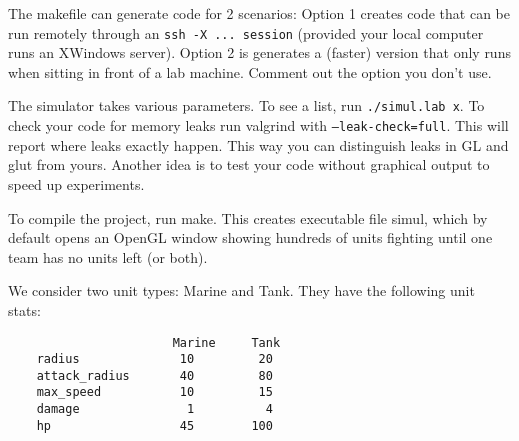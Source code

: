 \documentclass[a4paper,11pt]{article}
\begin{document}
\bigskip

The makefile can generate code for 2 scenarios: Option 1 creates code that can
be run remotely through an \texttt{ssh -X ... session} (provided your local computer
runs an XWindows server). Option 2 is generates a (faster) version that only
runs when sitting in front of a lab machine. Comment out the option you
don't use.

\bigskip

The simulator takes various parameters. To see a list, run \texttt{./simul.lab x}. To
check your code for memory leaks run valgrind with \texttt{--leak-check=full}. This
will report where leaks exactly happen. This way you can distinguish leaks in
GL and glut from yours. Another idea is to test your code without graphical
output to speed up experiments.

\bigskip

To compile the project, run make. This creates executable file simul, which by
default opens an OpenGL window showing hundreds of units fighting until one
team has no units left (or both).

\bigskip

We consider two unit types: Marine and Tank. They have the following 
unit stats:
\begin{verbatim}
                       Marine     Tank
    radius              10         20
    attack_radius       40         80
    max_speed           10         15
    damage               1          4
    hp                  45        100
\end{verbatim}
\end{document}
